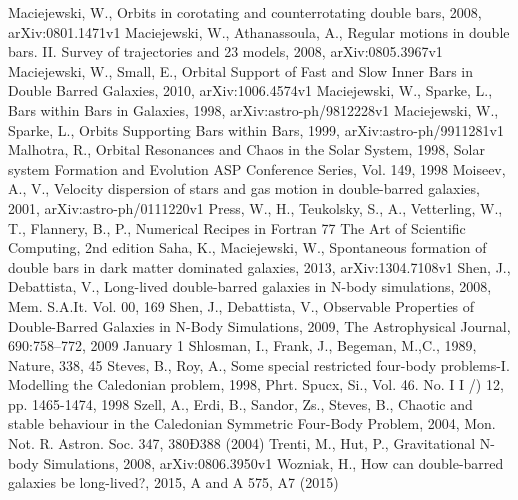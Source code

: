 \documentclass[a4paper,12pt]{article}
\begin{document}
\begin{thebibliography}{1}
Maciejewski, W., Orbits in corotating and counterrotating double bars, 2008, arXiv:0801.1471v1
Maciejewski, W., Athanassoula, A., Regular motions in double bars. II. Survey of trajectories and 23 models, 2008, arXiv:0805.3967v1
Maciejewski, W., Small, E., Orbital Support of Fast and Slow Inner Bars in Double Barred Galaxies, 2010, arXiv:1006.4574v1
Maciejewski, W., Sparke, L., Bars within Bars in Galaxies, 1998, arXiv:astro-ph/9812228v1
Maciejewski, W., Sparke, L., Orbits Supporting Bars within Bars, 1999, arXiv:astro-ph/9911281v1
Malhotra, R., Orbital Resonances and Chaos in the Solar System, 1998, Solar system Formation and Evolution ASP Conference Series, Vol. 149, 1998
Moiseev, A., V., Velocity dispersion of stars and gas motion in double-barred galaxies, 2001, arXiv:astro-ph/0111220v1
Press, W., H., Teukolsky, S., A., Vetterling, W., T., Flannery, B., P., Numerical Recipes in Fortran 77 The Art of Scientific Computing, 2nd edition
Saha, K., Maciejewski, W., Spontaneous formation of double bars in dark matter dominated galaxies, 2013, arXiv:1304.7108v1
Shen, J., Debattista, V., Long-lived double-barred galaxies in N-body simulations, 2008, Mem. S.A.It. Vol. 00, 169
Shen, J., Debattista, V., Observable Properties of Double-Barred Galaxies in N-Body Simulations, 2009, The Astrophysical Journal, 690:758–772, 2009 January 1
Shlosman, I., Frank, J., Begeman, M.,C., 1989, Nature, 338, 45
Steves, B., Roy, A., Some special restricted four-body problems-I. Modelling the Caledonian problem, 1998, Phrt. Spucx, Si., Vol. 46. No. I I /) 12, pp. 1465-1474, 1998
Szell, A., Erdi, B., Sandor, Zs., Steves, B., Chaotic and stable behaviour in the Caledonian Symmetric Four-Body Problem, 2004, Mon. Not. R. Astron. Soc. 347, 380Ð388 (2004)
Trenti, M., Hut, P., Gravitational N-body Simulations, 2008, arXiv:0806.3950v1
Wozniak, H., How can double-barred galaxies be long-lived?, 2015, A and A 575, A7 (2015)
\end{thebibliography}
\end{document}
